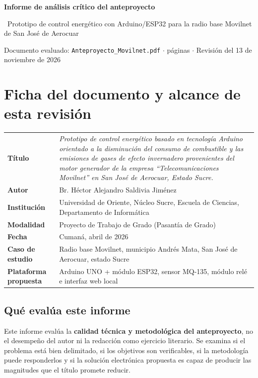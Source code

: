 \documentclass[11pt,a4paper]{article}
\newcommand{\iconoBanda}{microchip}
\newcommand{\bandaTitulo}[3][fondoOscuro]{%
  \begin{tcolorbox}[
    enhanced,
    colback=#1, colframe=#1,
    boxrule=0pt, arc=8pt, outer arc=8pt,
    width=\linewidth,
    top=18pt, bottom=6pt, left=14pt, right=14pt,
    borderline south={3.5pt}{0pt}{cyanNeon},
  ]
    \begin{minipage}[c]{0.07\linewidth}
      \centering
      \textcolor{cyanNeon}{\fontsize{30}{30}\selectfont\faIcon{\iconoBanda}}
    \end{minipage}%
    \hspace{8pt}%
    \begin{minipage}[c]{0.88\linewidth}
      {\fontsize{20}{24}\selectfont\bfseries\color{white}#2}\par\vspace{5pt}%
      \textcolor{cyanNeon!80!white}{\small\faIcon{angle-right}~#3}%
    \end{minipage}
    \vspace{4pt}
  \end{tcolorbox}%
  \vspace{8pt}%
}
\begin{document}
\bandaTitulo{Informe de análisis crítico del anteproyecto}{Prototipo de control energético con Arduino/ESP32 para la radio base Movilnet de San José de Aerocuar}

\begin{center}
\small\color{grisTexto}
Documento evaluado: \texttt{Anteproyecto\_Movilnet.pdf} \quad$\cdot$ páginas \quad$\cdot$\quad
Revisión del 13 de noviembre de 2026
\end{center}

\vspace{4pt}

\section{Ficha del documento y alcance de esta revisión}

\begin{tcolorbox}[cajaContenido]
\begin{tabularx}{\linewidth}{@{}>{\bfseries}p{3.8cm}X@{}}
\toprule
Título & \emph{Prototipo de control energético basado en tecnología Arduino orientado a la disminución del consumo de combustible y las emisiones de gases de efecto invernadero provenientes del motor generador de la empresa ``Telecomunicaciones Movilnet'' en San José de Aerocuar, Estado Sucre.} \\
Autor & Br. Héctor Alejandro Saldivia Jiménez \\
Institución & Universidad de Oriente, Núcleo Sucre, Escuela de Ciencias, Departamento de Informática \\
Modalidad & Proyecto de Trabajo de Grado (Pasantía de Grado) \\
Fecha & Cumaná, abril de 2026 \\
Caso de estudio & Radio base Movilnet, municipio Andrés Mata, San José de Aerocuar, estado Sucre \\
Plataforma propuesta & Arduino UNO + módulo ESP32, sensor MQ-135, módulo relé e interfaz web local \\
\bottomrule
\end{tabularx}
\end{tcolorbox}

\subsection*{Qué evalúa este informe}

Este informe evalúa la \textbf{calidad técnica y metodológica del anteproyecto}, no el desempeño del autor ni la redacción como ejercicio literario. Se examina si el problema está bien delimitado, si los objetivos son verificables, si la metodología puede responderlos y si la solución electrónica propuesta es capaz de producir las magnitudes que el título promete reducir.
\end{document}
